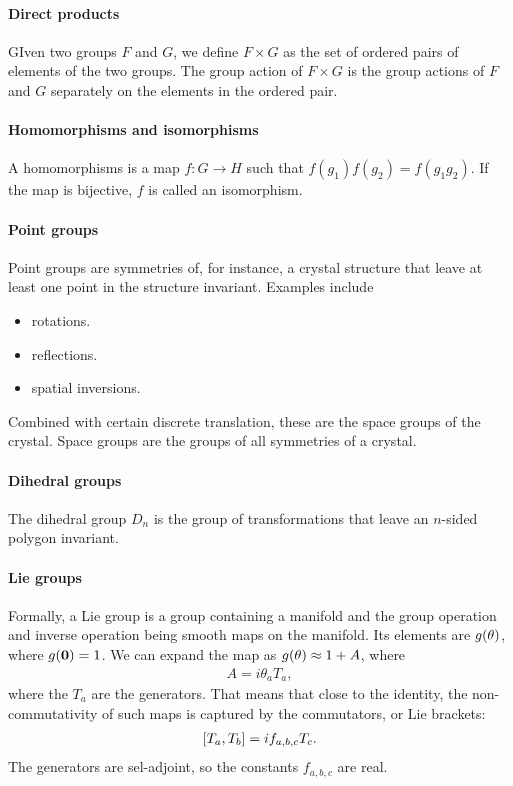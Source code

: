 \paragraph{Direct products}
GIven two groups $F$ and $G$, we define $F\times G$ as the set of ordered pairs of elements of the two groups. The group action of $F\times G$ is the group actions of $F$ and $G$ separately on the elements in the ordered pair.

\paragraph{Homomorphisms and isomorphisms}
A homomorphisms is a map $f: G\to H$ such that $f(g_{1})f(g_{2}) = f(g_{1}g_{2})$. If the map is bijective, $f$ is called an isomorphism.

\paragraph{Point groups}
Point groups are symmetries of, for instance, a crystal structure that leave at least one point in the structure invariant. Examples include
\begin{itemize}
	\item rotations.
	\item reflections.
	\item spatial inversions.
\end{itemize}
Combined with certain discrete translation, these are the space groups of the crystal. Space groups are the groups of all symmetries of a crystal.

\paragraph{Dihedral groups}
The dihedral group $D_{n}$ is the group of transformations that leave an $n$-sided polygon invariant.

\paragraph{Lie groups}
Formally, a Lie group is a group containing a manifold and the group operation and inverse operation being smooth maps on the manifold. Its elements are $g(\vb{\theta})$, where $g(\vb{0}) = 1$. We can expand the map as $g(\vb{\theta})\approx 1 + A$, where
\begin{align*}
	A = i\theta_{a}T_{a},
\end{align*}
where the $T_{a}$ are the generators. That means that close to the identity, the non-commutativity of such maps is captured by the commutators, or Lie brackets:
\begin{align*}
	\left[T_{a}, T_{b}\right] = if_{a, b, c}T_{c}.
\end{align*}
The generators are sel-adjoint, so the constants $f_{a, b, c}$ are real.

